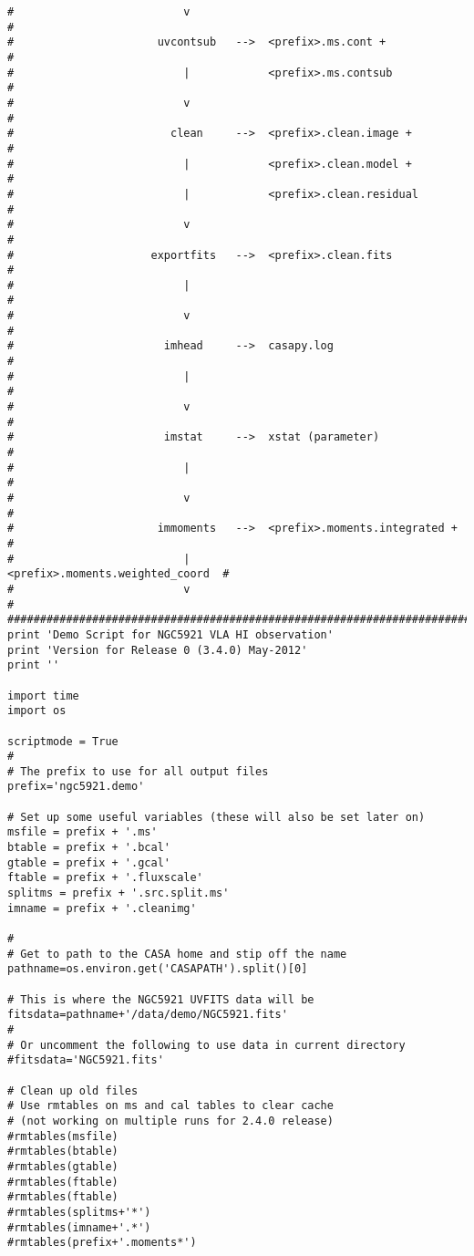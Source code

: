 \begin{verbatim}
#                          v                                             #
#                      uvcontsub   -->  <prefix>.ms.cont +               #
#                          |            <prefix>.ms.contsub              #
#                          v                                             #
#                        clean     -->  <prefix>.clean.image +           #
#                          |            <prefix>.clean.model +           #
#                          |            <prefix>.clean.residual          #
#                          v                                             #
#                     exportfits   -->  <prefix>.clean.fits              #
#                          |                                             #
#                          v                                             #
#                       imhead     -->  casapy.log                       #
#                          |                                             #
#                          v                                             #
#                       imstat     -->  xstat (parameter)                #
#                          |                                             #
#                          v                                             #
#                      immoments   -->  <prefix>.moments.integrated +    #
#                          |            <prefix>.moments.weighted_coord  #
#                          v                                             #
##########################################################################
print 'Demo Script for NGC5921 VLA HI observation'
print 'Version for Release 0 (3.4.0) May-2012'
print ''

import time
import os

scriptmode = True
# 
# The prefix to use for all output files
prefix='ngc5921.demo'

# Set up some useful variables (these will also be set later on)
msfile = prefix + '.ms'
btable = prefix + '.bcal'
gtable = prefix + '.gcal'
ftable = prefix + '.fluxscale'
splitms = prefix + '.src.split.ms'
imname = prefix + '.cleanimg'

#
# Get to path to the CASA home and stip off the name
pathname=os.environ.get('CASAPATH').split()[0]

# This is where the NGC5921 UVFITS data will be
fitsdata=pathname+'/data/demo/NGC5921.fits'
#
# Or uncomment the following to use data in current directory
#fitsdata='NGC5921.fits'

# Clean up old files
# Use rmtables on ms and cal tables to clear cache
# (not working on multiple runs for 2.4.0 release)
#rmtables(msfile)
#rmtables(btable)
#rmtables(gtable)
#rmtables(ftable)
#rmtables(ftable)
#rmtables(splitms+'*')
#rmtables(imname+'.*')
#rmtables(prefix+'.moments*')


\end{verbatim}
